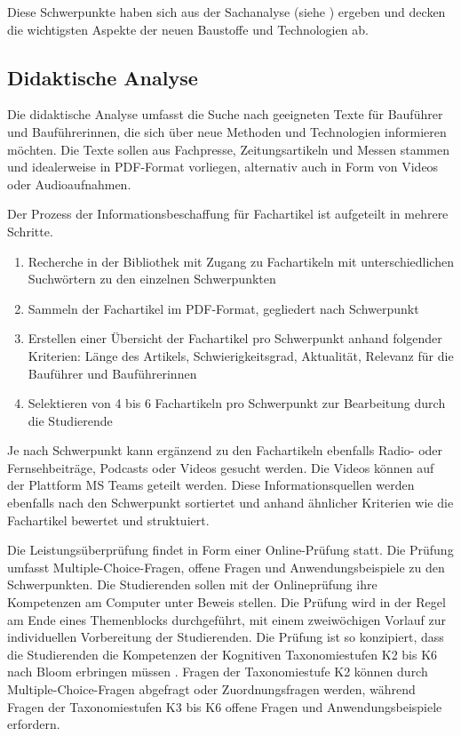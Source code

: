 \documentclass[
11pt,
captions=tableheading,
smallheadings,
headsepline,
footsepline, 
captions=tableheading,
parskip=half-,
]{scrartcl}
\begin{document}
Diese Schwerpunkte haben sich aus der Sachanalyse (siehe ) ergeben und decken die wichtigsten Aspekte der neuen Baustoffe und Technologien ab.



\subsection{Didaktische Analyse}
Die didaktische Analyse umfasst die Suche nach geeigneten Texte für Bauführer und Bauführerinnen, die sich über neue Methoden und Technologien informieren möchten.
Die Texte sollen aus Fachpresse, Zeitungsartikeln und Messen stammen und idealerweise in PDF-Format vorliegen, alternativ auch in Form von Videos oder Audioaufnahmen.

Der Prozess der Informationsbeschaffung für Fachartikel ist aufgeteilt in mehrere Schritte.





\begin{enumerate}
    \item Recherche in der Bibliothek mit Zugang zu Fachartikeln mit unterschiedlichen Suchwörtern zu den einzelnen Schwerpunkten
    \item Sammeln der Fachartikel im PDF-Format, gegliedert nach Schwerpunkt
    \item Erstellen einer Übersicht der Fachartikel pro Schwerpunkt anhand folgender Kriterien: Länge des Artikels, Schwierigkeitsgrad, Aktualität, Relevanz für die Bauführer und Bauführerinnen
    \item Selektieren von 4 bis 6 Fachartikeln pro Schwerpunkt zur Bearbeitung durch die Studierende
\end{enumerate}

Je nach Schwerpunkt kann ergänzend zu den Fachartikeln ebenfalls Radio- oder Fernsehbeiträge, Podcasts oder Videos gesucht werden.
Die Videos können auf der Plattform MS Teams geteilt werden.
Diese Informationsquellen werden ebenfalls nach den Schwerpunkt sortiertet und anhand ähnlicher Kriterien wie die Fachartikel bewertet und struktuiert.

Die Leistungsüberprüfung findet in Form einer Online-Prüfung statt.
Die Prüfung umfasst Multiple-Choice-Fragen, offene Fragen und Anwendungsbeispiele zu den Schwerpunkten.
Die Studierenden sollen mit der Onlineprüfung ihre Kompetenzen am Computer unter Beweis stellen.
Die Prüfung wird in der Regel am Ende eines Themenblocks durchgeführt, mit einem zweiwöchigen Vorlauf zur individuellen Vorbereitung der Studierenden.
Die Prüfung ist so konzipiert, dass die Studierenden die Kompetenzen der Kognitiven Taxonomiestufen K2 bis K6 nach Bloom erbringen müssen \cite{bloom1956taxonomy}.
Fragen der Taxonomiestufe K2 können durch Multiple-Choice-Fragen abgefragt oder Zuordnungsfragen werden, während Fragen der Taxonomiestufen K3 bis K6 offene Fragen und Anwendungsbeispiele erfordern.
\end{document}
